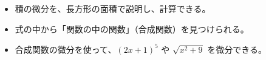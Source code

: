 \newcommand\bkgear[6]{\begin{scope}[shift={#1}]
  \pgfmathsetmacro\bkgR{#3*#2/2}\pgfmathsetmacro\bkgA{\bkgR+#3}%
  \pgfmathsetmacro\bkgF{\bkgR-1.25*#3}\pgfmathsetmacro\bkgP{360/#2}%
  \pgfmathsetmacro\bkgT{27*#3/\bkgA}\pgfmathsetmacro\bkgB{54*#3/\bkgF}%
  \filldraw[fill=#5, draw=#6, line width=0.5pt, line join=round]
    (#4-\bkgB:\bkgF)
    \foreach \k [evaluate=\k as \c using #4+\k*\bkgP] in {0,...,\numexpr#2-1\relax}{
      -- (\c-\bkgB:\bkgF) -- (\c-\bkgT:\bkgA) -- (\c+\bkgT:\bkgA) -- (\c+\bkgB:\bkgF)
      arc[start angle=\c+\bkgB, end angle=\c+\bkgP-\bkgB, radius=\bkgF]} -- cycle;
  \filldraw[fill=white, draw=#6, line width=0.5pt] (0,0) circle ({max(0.9,0.22*\bkgR)});
  \fill[#6] (0,0) circle (0.55);
\end{scope}}

\begin{goal}
\begin{itemize}[label={\color{bkTheme}●}, leftmargin=1.6\zw, itemsep=0pt, topsep=1pt]
\item {}\enspace 積の微分を、長方形の面積で説明し、計算できる。
\item {}\enspace 式の中から「関数の中の関数」（合成関数）を見つけられる。
\item {}\enspace 合成関数の微分を使って、$(2x+1)^5$ や $\sqrt{x^2+9}$ を微分できる。
\end{itemize}
\end{goal}

